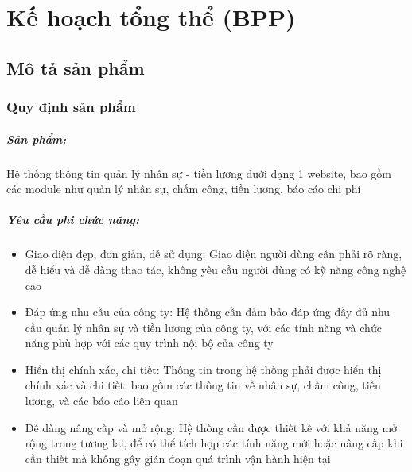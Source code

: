 \chapter{Kế hoạch tổng thể (BPP)}
\label{Chapter2}

\section{Mô tả sản phẩm}
\subsection{Quy định sản phẩm}
\paragraph{Sản phẩm:} Hệ thống thông tin quản lý nhân sự - tiền lương dưới dạng 1 website, bao gồm các module như quản lý nhân sự, chấm công, tiền lương, báo cáo chi phí
\paragraph{Yêu cầu phi chức năng:}
\begin{itemize}
    \item Giao diện đẹp, đơn giản, dễ sử dụng: Giao diện người dùng cần phải rõ ràng, dễ hiểu và dễ dàng thao tác, không yêu cầu người dùng có kỹ năng công nghệ cao
    \item Đáp ứng nhu cầu của công ty: Hệ thống cần đảm bảo đáp ứng đầy đủ nhu cầu quản lý nhân sự và tiền lương của công ty, với các tính năng và chức năng phù hợp với các quy trình nội bộ của công ty
    \item Hiển thị chính xác, chi tiết: Thông tin trong hệ thống phải được hiển thị chính xác và chi tiết, bao gồm các thông tin về nhân sự, chấm công, tiền lương, và các báo cáo liên quan
    \item Dễ dàng nâng cấp và mở rộng: Hệ thống cần được thiết kế với khả năng mở rộng trong tương lai, để có thể tích hợp các tính năng mới hoặc nâng cấp khi cần thiết mà không gây gián đoạn quá trình vận hành hiện tại
\end{itemize}
